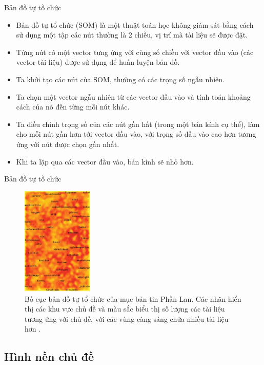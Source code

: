 \documentclass[10pt]{beamer}
\theoremstyle{remark}
\theoremstyle{definition}
\begin{document}
\begin{frame}{Bản đồ tự tồ chức}
	\begin{itemize}
		\item Bản đồ tự tổ chức (SOM) \cite{248} là một thuật toán học không giám sát bằng cách sử dụng một tập các nút thường là 2 chiều, vị trí mà tài liệu sẽ được đặt.
		\item Từng nút có một vector tưng ứng với cùng số chiều với vector đầu vào (các vector tài liệu) được sử dụng để huấn luyện bản đồ.
		\item Ta khởi tạo các nút của SOM, thường có các trọng số ngẫu nhiên.
		\item Ta chọn một vector ngẫu nhiên từ các vector đầu vào và tính toán khoảng cách của nó đến từng mỗi nút khác.
		\item Ta điều chỉnh trọng số của các nút gần hất (trong một bán kính cụ thể), làm cho mỗi nút gần hơn tới vector đầu vào,
		với trọng số đầu vào cao hơn tương ứng với nút được chọn gần nhất.
		\item Khi ta lặp qua các vector đầu vào, bán kính sẽ nhỏ hơn.
	\end{itemize}
\end{frame}

\begin{frame}{Bản đồ tự tồ chức}
	\begin{figure}[h!]
        \centering
        \includegraphics[width=0.3\textwidth]{10.png}
        \caption{Bố cục bản đồ tự tổ chức của mục bản tin Phần Lan.
        Các nhãn hiển thị các khu vực chủ đề và màu sắc biểu thị số lượng các tài liệu tương ứng với chủ đề, với các vùng càng sáng chứa nhiều tài liệu hơn \cite{454}.}
        \label{fig:10}
    \end{figure}
\end{frame}

\subsection{Hình nền chủ đề}
\end{document}
